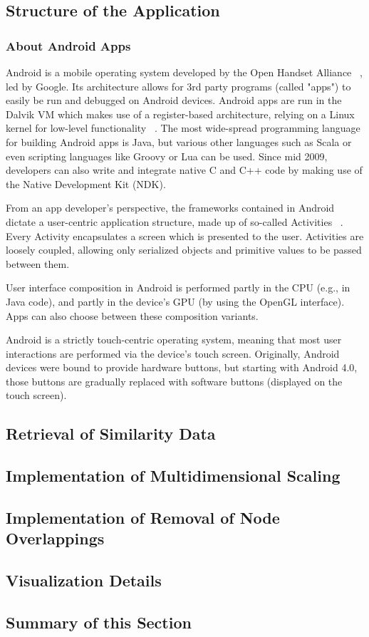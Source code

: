\subsection{Structure of the Application}

\subsubsection{About Android Apps}

Android is a mobile operating system developed by the Open Handset Alliance ~\cite{url:openhandsetalliance}, led by Google. Its architecture allows for 3rd party programs (called "apps") to easily be run and debugged on Android devices.
Android apps are run in the Dalvik VM which makes use of a register-based architecture, relying on a Linux kernel for low-level functionality ~\cite{dalvik}. The most wide-spread programming language for building Android apps is Java, but various other languages such as Scala or even scripting languages like Groovy or Lua can be used. Since mid 2009, developers can also write and integrate native C and C++ code by making use of the Native Development Kit (NDK).

From an app developer's perspective, the frameworks contained in Android dictate a user-centric application structure, made up of so-called Activities ~\cite{url:androidactivity}. Every Activity encapsulates a screen which is presented to the user. Activities are loosely coupled, allowing only serialized objects and primitive values to be passed between them.

User interface composition in Android is performed partly in the CPU (e.g., in Java code), and partly in the device's GPU (by using the OpenGL interface). Apps can also choose between these composition variants.

Android is a strictly touch-centric operating system, meaning that most user interactions are performed via the device's touch screen. Originally, Android devices were bound to provide hardware buttons, but starting with Android 4.0, those buttons are gradually replaced with software buttons (displayed on the touch screen).

\subsection{Retrieval of Similarity Data}



\subsection{Implementation of Multidimensional Scaling}
\label{subsec:implementation-mds}

\subsection{Implementation of Removal of Node Overlappings}
\label{subsec:implementation-overlapping}

\subsection{Visualization Details}

\subsection{Summary of this Section}